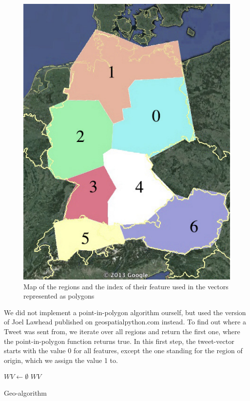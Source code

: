 \documentclass[./Main.tex]{subfiles}
\begin{document}
\begin{figure}
  \begin{center}
   \includegraphics[width=0.5\columnwidth]{../img/polygone_satt.jpg}
    \caption{\label{geo_polymap} Map of the regions and the index of their feature used in the vectors represented as polygons}
  \end{center}
\end{figure}

We did not implement a point-in-polygon algorithm ourself, but used the version of Joel Lawhead published on geospatialpython.com \cite{GeoPy} instead.  
To find out where a Tweet was sent from, we iterate over all regions and return the first one, where the point-in-polygon function returns true.
In this first step, the tweet-vector starts with the value 0 for all features, except the one standing for the region of origin, which we assign the value 1 to.

\begin{algorithm}[t]
 \SetAlgoLined
 $WV \gets\emptyset $\; 
\Return $WV$\;
\label{geo-algo}
\caption{Geo-algorithm}
\end{algorithm}
\end{document}
